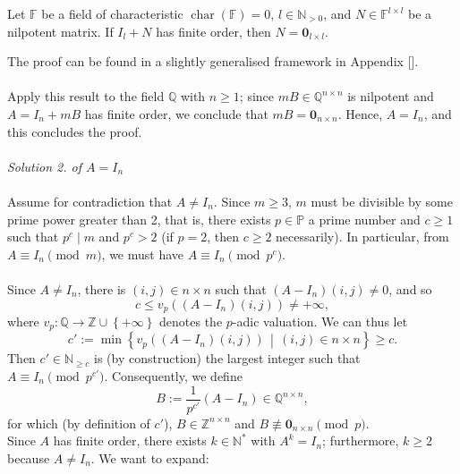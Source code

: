 \begin{solution}
    \begin{lemma}
        Let \( \mathbb{F} \) be a field of characteristic \( \operatorname{char}\left(\mathbb{F}\right) = 0 \), \( l \in \mathbb{N}_{>0} \), and \( N \in \mathbb{F}^{l \times l} \) be a nilpotent matrix. If \( I_{l} + N \) has finite order, then \( N = \mathbf{0}_{l \times l} \).
    \end{lemma}
    The proof can be found in a slightly generalised framework in Appendix [].
    \\\\
    Apply this result to the field \( \mathbb{Q} \) with \( n \geq 1 \); since \( mB \in \mathbb{Q}^{n \times n} \) is nilpotent and \( A = I_n + mB \) has finite order, we conclude that \( mB = \mathbf{0}_{n \times n} \). Hence, \( A = I_n \), and this concludes the proof.
    \\\\
    \textit{Solution 2. of \( A=I_n \)}
    \\\\
    Assume for contradiction that \( A \neq I_n \). Since \( m \geq 3 \), \( m \) must be divisible by some prime power greater than 2, that is, there exists \( p \in \mathbb{P} \) a prime number and \( c \geq 1 \) such that \( p^c \mid m \) and \( p^c > 2 \) (if \( p = 2 \), then \( c \geq 2 \) necessarily). In particular, from \( A \equiv I_n \pmod{m} \), we must have \( A \equiv I_n \pmod{p^c} \).
    \\\\
    Since \( A \neq I_n \), there is \( \left( i,j \right) \in n \times n \) such that \( \left( A - I_n \right)\left( i,j \right) \neq 0 \), and so
    \[
        c \leq v_p\left( \left( A - I_n \right)\left( i,j \right) \right) \neq +\infty,
    \]
    where \( v_p \colon \mathbb{Q} \rightarrow \mathbb{Z} \cup \left\{ +\infty \right\} \) denotes the \( p \)-adic valuation. We can thus let
    \[
        c' := \min\left\{ v_p\left( \left( A - I_n \right)\left( i,j \right) \right) \,\middle\vert\, \left( i,j \right) \in n \times n \right\} \geq c.
    \]
    Then \( c' \in \mathbb{N}_{\geq c} \) is (by construction) the largest integer such that \( A \equiv I_n \pmod{p^{c'}} \). Consequently, we define
    \[
        B := \frac{1}{p^{c'}} \left( A - I_n \right) \in \mathbb{Q}^{n\times n},
    \]
    for which (by definition of \( c' \)), \( B \in \mathbb{Z}^{n \times n} \) and \( B \not\equiv \mathbf{0}_{n \times n} \pmod{p} \). \\
    Since \( A \) has finite order, there exists \( k \in \mathbb{N}^{*} \) with \( A^k = I_n \); furthermore, \( k \geq 2 \) because \( A \neq I_n \). We want to expand:

\end{solution}
